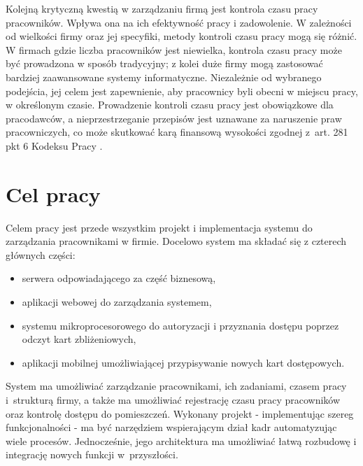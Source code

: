 Kolejną krytyczną kwestią w zarządzaniu firmą jest kontrola czasu pracy pracowników. Wpływa ona na ich efektywność pracy i zadowolenie. W zależności od wielkości firmy oraz jej specyfiki, metody kontroli czasu pracy mogą się różnić. W firmach gdzie liczba pracowników jest niewielka, kontrola czasu pracy może być prowadzona w sposób tradycyjny; z kolei duże firmy mogą zastosować bardziej zaawansowane systemy informatyczne. Niezależnie od wybranego podejścia, jej celem jest zapewnienie, aby pracownicy byli obecni w miejscu pracy, w określonym czasie. Prowadzenie kontroli czasu pracy jest obowiązkowe dla pracodawców, a nieprzestrzeganie przepisów jest uznawane za naruszenie praw pracowniczych, co może skutkować karą finansową wysokości zgodnej z~art. 281 pkt 6 Kodeksu Pracy \cite{bib:KodeksPracy}.

\section{Cel pracy}



Celem pracy jest przede wszystkim projekt i implementacja systemu do zarządzania pracownikami w firmie. Docelowo system ma składać się z czterech głównych części:

\begin{itemize}
    \item serwera odpowiadającego za część biznesową,
    \item aplikacji webowej do zarządzania systemem,
    \item systemu mikroprocesorowego do autoryzacji i przyznania dostępu poprzez odczyt kart zbliżeniowych,
    \item aplikacji mobilnej umożliwiającej przypisywanie nowych kart dostępowych.
\end{itemize}

System ma umożliwiać zarządzanie pracownikami, ich zadaniami, czasem pracy i~strukturą firmy, a także ma umożliwiać rejestrację czasu pracy pracowników oraz kontrolę dostępu do pomieszczeń. Wykonany projekt - implementując szereg funkcjonalności - ma być narzędziem wspierającym dział kadr automatyzując wiele procesów. Jednocześnie, jego architektura ma umożliwiać łatwą rozbudowę i integrację nowych funkcji w~przyszłości.

